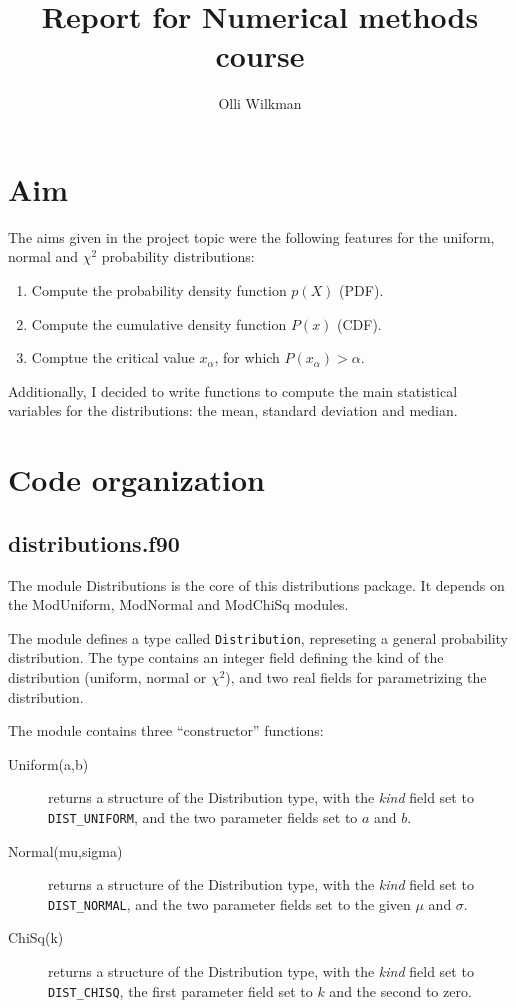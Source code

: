 \documentclass[a4paper]{article}
\title{Report for Numerical methods course}
\author{Olli Wilkman}
\begin{document}
\maketitle

\section{Aim}

The aims given in the project topic were the following features for the uniform, normal and $\chi^2$ probability distributions:

\begin{enumerate}
    \item Compute the probability density function $p(X)$ (PDF).
    \item Compute the cumulative density function $P(x)$ (CDF).
    \item Comptue the critical value $x_\alpha$, for which $P(x_\alpha) > \alpha$.
\end{enumerate}

Additionally, I decided to write functions to compute the main statistical variables for the distributions: the mean, standard deviation and median.


\section{Code organization}

\subsection{distributions.f90}

The module Distributions is the core of this distributions package. It depends on the ModUniform, ModNormal and ModChiSq modules.

The module defines a type called \verb+Distribution+, represeting a general probability distribution. The type contains an integer field defining the kind of the distribution (uniform, normal or $\chi^2$), and two real fields for parametrizing the distribution.

The module contains three ``constructor'' functions:

\begin{description}
    \item[Uniform(a,b)] returns a structure of the Distribution type, with the \emph{kind} field set to \verb+DIST_UNIFORM+, and the two parameter fields set to $a$ and $b$.
    \item[Normal(mu,sigma)] returns a structure of the Distribution type, with the \emph{kind} field set to \verb+DIST_NORMAL+, and the two parameter fields set to the given $\mu$ and $\sigma$.
    \item[ChiSq(k)] returns a structure of the Distribution type, with the \emph{kind} field set to \verb+DIST_CHISQ+, the first parameter field set to $k$ and the second to zero.
\end{description}
\end{document}
